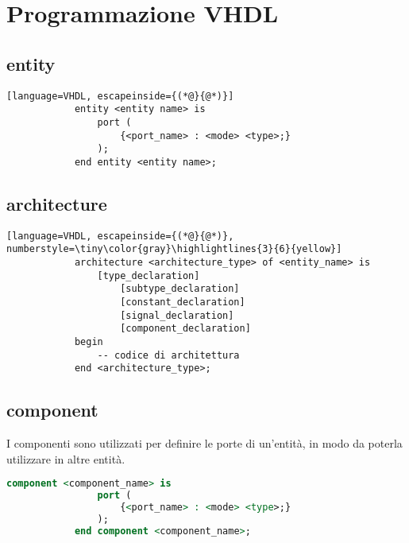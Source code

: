 \section{Programmazione VHDL}
    \subsection{entity}
        \begin{lstlisting}[language=VHDL, escapeinside={(*@}{@*)}]
            entity <entity name> is
                port (
                    {<port_name> : <mode> <type>;}
                );
            end entity <entity name>;
        \end{lstlisting}

    \subsection{architecture}
        \begin{lstlisting}[language=VHDL, escapeinside={(*@}{@*)}, numberstyle=\tiny\color{gray}\highlightlines{3}{6}{yellow}]
            architecture <architecture_type> of <entity_name> is
                [type_declaration]
                    [subtype_declaration]
                    [constant_declaration]
                    [signal_declaration]
                    [component_declaration]
            begin
                -- codice di architettura
            end <architecture_type>;
        \end{lstlisting}


    \subsection{component}
        I componenti sono utilizzati per definire le porte di un'entità, in modo da poterla utilizzare in altre entità.
        \begin{lstlisting}[language=VHDL]
            component <component_name> is
                port (
                    {<port_name> : <mode> <type>;}
                );
            end component <component_name>;
        \end{lstlisting}


